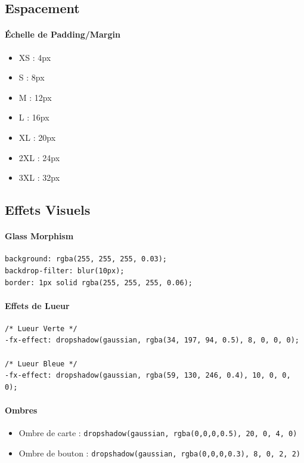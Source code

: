 \documentclass[12pt, a4paper]{report}
\begin{document}
\subsection{Espacement}

\paragraph{Échelle de Padding/Margin}
\begin{itemize}
    \item XS : 4px
    \item S : 8px
    \item M : 12px
    \item L : 16px
    \item XL : 20px
    \item 2XL : 24px
    \item 3XL : 32px
\end{itemize}

\subsection{Effets Visuels}

\paragraph{Glass Morphism}
\begin{verbatim}
background: rgba(255, 255, 255, 0.03);
backdrop-filter: blur(10px);
border: 1px solid rgba(255, 255, 255, 0.06);
\end{verbatim}

\paragraph{Effets de Lueur}
\begin{verbatim}
/* Lueur Verte */
-fx-effect: dropshadow(gaussian, rgba(34, 197, 94, 0.5), 8, 0, 0, 0);

/* Lueur Bleue */
-fx-effect: dropshadow(gaussian, rgba(59, 130, 246, 0.4), 10, 0, 0, 0);
\end{verbatim}

\paragraph{Ombres}
\begin{itemize}
    \item Ombre de carte : \texttt{dropshadow(gaussian, rgba(0,0,0,0.5), 20, 0, 4, 0)}
    \item Ombre de bouton : \texttt{dropshadow(gaussian, rgba(0,0,0,0.3), 8, 0, 2, 2)}
\end{itemize}
\end{document}
